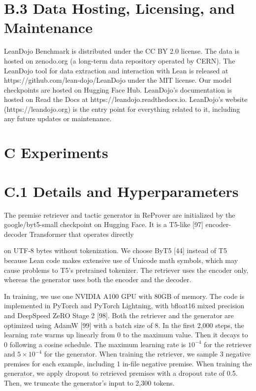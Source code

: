 \documentclass[
]{article}
\begin{document}
\section{B.3 Data Hosting, Licensing, and
Maintenance}\label{b.3-data-hosting-licensing-and-maintenance}

LeanDojo Benchmark is distributed under the CC BY 2.0 license. The data
is hosted on zenodo.org (a long-term data repository operated by CERN).
The LeanDojo tool for data extraction and interaction with Lean is
released at https://github.com/lean-dojo/LeanDojo under the MIT license.
Our model checkpoints are hosted on Hugging Face Hub. LeanDojo's
documentation is hosted on Read the Docs at
https://leandojo.readthedocs.io. LeanDojo's website
(https://leandojo.org) is the entry point for everything related to it,
including any future updates or maintenance.

\section{C Experiments}\label{c-experiments}

\section{C.1 Details and
Hyperparameters}\label{c.1-details-and-hyperparameters}

The premise retriever and tactic generator in ReProver are initialized
by the google/byt5-small checkpoint on Hugging Face. It is a T5-like
{[}97{]} encoder-decoder Transformer that operates directly

on UTF-8 bytes without tokenization. We choose ByT5 {[}44{]} instead of
T5 because Lean code makes extensive use of Unicode math symbols, which
may cause problems to T5's pretrained tokenizer. The retriever uses the
encoder only, whereas the generator uses both the encoder and the
decoder.

In training, we use one NVIDIA A100 GPU with 80GB of memory. The code is
implemented in PyTorch and PyTorch Lightning, with bfloat16 mixed
precision and DeepSpeed ZeRO Stage 2 {[}98{]}. Both the retriever and
the generator are optimized using AdamW {[}99{]} with a batch size of 8.
In the first 2,000 steps, the learning rate warms up linearly from 0 to
the maximum value. Then it decays to 0 following a cosine schedule. The
maximum learning rate is \(10^{-4}\) for the retriever and
\(5 \times 10^{-4}\) for the generator. When training the retriever, we
sample 3 negative premises for each example, including 1 in-file
negative premise. When training the generator, we apply dropout to
retrieved premises with a dropout rate of 0.5. Then, we truncate the
generator's input to 2,300 tokens.
\end{document}

